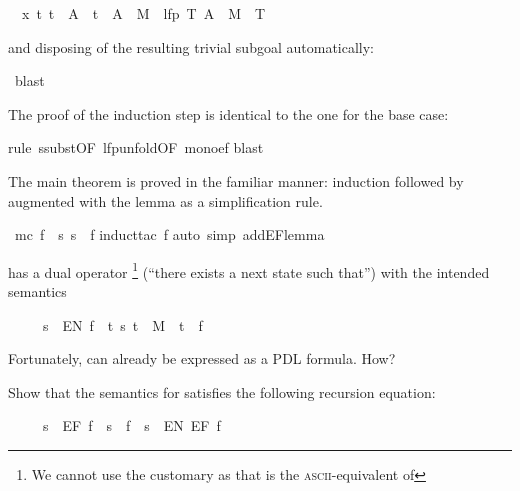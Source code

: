 \begin{isabellebody}
\begin{isamarkuptxt}
\begin{isabelle}
\ {}{\isachardot}\ {\isasymAnd}x\ t{\isachardot}\ t\ {\isasymin}\ A\ {\isasymLongrightarrow}\ t\ {\isasymin}\ A\ {\isasymunion}\ M{\isasyminverse}\ {\isacharbackquote}{\isacharbackquote}\ lfp\ {\isacharparenleft}{\isasymlambda}T{\isachardot}\ A\ {\isasymunion}\ M{\isasyminverse}\ {\isacharbackquote}{\isacharbackquote}\ T{\isacharparenright}%
\end{isabelle}
and disposing of the resulting trivial subgoal automatically:%
\end{isamarkuptxt}%
\ blast{\isacharparenright}%
\begin{isamarkuptxt}%
\noindent
The proof of the induction step is identical to the one for the base case:%
\end{isamarkuptxt}%
rule\ ssubst{\isacharbrackleft}OF\ lfp{\isacharunderscore}unfold{\isacharbrackleft}OF\ mono{\isacharunderscore}ef{\isacharbrackright}{\isacharbrackright}{\isacharparenright}\isanewline
{}blast{\isacharparenright}\isanewline
{}%
\begin{isamarkuptext}%
The main theorem is proved in the familiar manner: induction followed by
 augmented with the lemma as a simplification rule.%
\end{isamarkuptext}%
\ {\isachardoublequote}mc\ f\ {\isacharequal}\ {\isacharbraceleft}s{\isachardot}\ s\ {\isasymTurnstile}\ f{\isacharbraceright}{\isachardoublequote}\isanewline
{}induct{\isacharunderscore}tac\ f{\isacharparenright}\isanewline
{}auto\ simp\ add{\isacharcolon}EF{\isacharunderscore}lemma{\isacharparenright}\isanewline
{}%
\begin{isamarkuptext}%
\begin{exercise}
 has a dual operator \footnote{We cannot use the customary 
as that is the \textsc{ascii}-equivalent of \isa{{\isasymexists}}}
(``there exists a next state such that'') with the intended semantics
\begin{isabelle}%
\ \ \ \ \ s\ {\isasymTurnstile}\ EN\ f\ {\isacharequal}\ {\isacharparenleft}{\isasymexists}t{\isachardot}\ {\isacharparenleft}s{\isacharcomma}\ t{\isacharparenright}\ {\isasymin}\ M\ {\isasymand}\ t\ {\isasymTurnstile}\ f{\isacharparenright}%
\end{isabelle}
Fortunately,  can already be expressed as a PDL formula. How?

Show that the semantics for  satisfies the following recursion equation:
\begin{isabelle}%
\ \ \ \ \ s\ {\isasymTurnstile}\ EF\ f\ {\isacharequal}\ {\isacharparenleft}s\ {\isasymTurnstile}\ f\ {\isasymor}\ s\ {\isasymTurnstile}\ EN\ {\isacharparenleft}EF\ f{\isacharparenright}{\isacharparenright}%
\end{isabelle}
\end{exercise}
%
\end{isamarkuptext}%
\end{isabellebody}%
